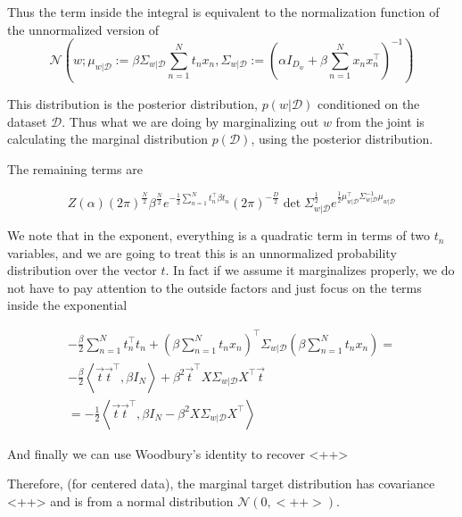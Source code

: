 \documentclass[a4paper]{article}
\begin{document}
Thus the term inside the integral is equivalent to the normalization function of the unnormalized version of 
\begin{equation}
  \mathcal{N} \left(
  w; 
  \mu_{w \vert \mathcal{D}} := 
    \beta \Sigma_{w \vert \mathcal{D} } \sum_{n=1}^N t_n x_n,
  \Sigma_{w \vert \mathcal{D} } := 
    \left(
      \alpha I_{D_w} + \beta \sum_{n=1}^N x_n x_n^\intercal
    \right) ^{-1}
  \right)
  \label{}
\end{equation}

This distribution is the posterior distribution, $p( w \vert \mathcal{D})$ conditioned on the dataset $\mathcal{D}$. 
Thus what we are doing by marginalizing out $w$ from the joint is calculating the marginal distribution $p( \mathcal{D} )$, using the posterior distribution.

The remaining terms are

\begin{equation}
  Z(\alpha) 
  \left( 2 \pi \right)^{\frac{N}{2}} 
  \beta^{\frac{N}{2}}
  e^{
    - \frac{1}{2} \sum_{n=1}^N t_n^\intercal \beta t_n
  }
  \left( 2 \pi \right) ^{- \frac{D}{2} }
  \det \Sigma_{ w \vert \mathcal{D} }^{\frac{1}{2} }
  e^{
    \frac{1}{2}
    \mu_{w \vert \mathcal{D} }^\intercal
    \Sigma_{w \vert \mathcal{D} }^{-1}
    \mu_{w \vert \mathcal{D} }
  }
  \label{}
\end{equation}

We note that in the exponent, everything is a quadratic term in terms of two $t_n$ variables, and we are going to treat this is an unnormalized probability distribution over the vector $t$. 
In fact if we assume it marginalizes properly, we do not have to pay attention to the outside factors and just focus on the terms inside the exponential

\begin{equation}
  \begin{split}
    - \frac{\beta}{2} \sum_{n=1}^N t_n^\intercal t_n
    + \left( \beta \sum_{n=1}^N t_n x_n \right)^\intercal
      \Sigma_{ w \vert \mathcal{D} }
      \left( \beta \sum_{n=1}^N t_n x_n \right) = \\
      - \frac{\beta}{2} \left< \vec{t} \vec{t}^\intercal, \beta I_N \right>
      + \beta^2 \vec{t}^\intercal X \Sigma_{ w \vert \mathcal{D} } X^\intercal \vec{t} \\
      = - \frac{1}{2} \left< \vec{t} \vec{t}^\intercal, \beta I_N - \beta^2 X \Sigma_{ w \vert \mathcal{D} } X^\intercal \right>
  \end{split}
  \label{}
\end{equation}

And finally we can use Woodbury's identity to recover <++>

Therefore, (for centered data), the marginal target distribution has covariance <++> and is from a normal distribution $\mathcal{N} \left( 0, <++> \right) $.
\end{document}
